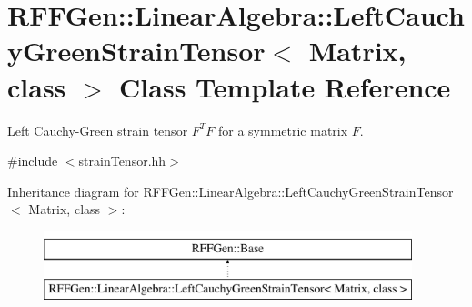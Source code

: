 \hypertarget{classRFFGen_1_1LinearAlgebra_1_1LeftCauchyGreenStrainTensor}{\section{R\-F\-F\-Gen\-:\-:Linear\-Algebra\-:\-:Left\-Cauchy\-Green\-Strain\-Tensor$<$ Matrix, class $>$ Class Template Reference}
\label{classRFFGen_1_1LinearAlgebra_1_1LeftCauchyGreenStrainTensor}
}


Left Cauchy-\/\-Green strain tensor $ F^T F $ for a symmetric matrix $ F $.  




{\ttfamily \#include $<$strain\-Tensor.\-hh$>$}

Inheritance diagram for R\-F\-F\-Gen\-:\-:Linear\-Algebra\-:\-:Left\-Cauchy\-Green\-Strain\-Tensor$<$ Matrix, class $>$\-:\begin{figure}[H]
\begin{center}
\leavevmode
\includegraphics[height=2.000000cm]{classRFFGen_1_1LinearAlgebra_1_1LeftCauchyGreenStrainTensor}
\end{center}
\end{figure}

